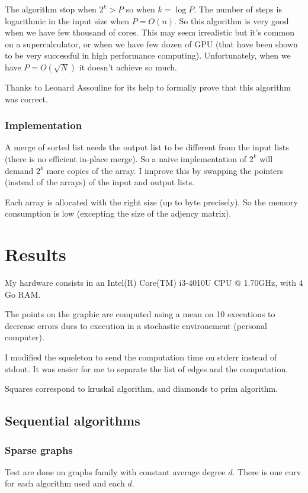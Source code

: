 \documentclass[a4paper, 10pt]{article}
\begin{document}
The algorithm stop when $2^k > P$ so when $k = \log P$. The number of steps is logarithmic in the input size when $P = O(n)$. So this algorithm is very good when we have few thousand of cores. This may seem irrealistic but it's common on a supercalculator, or when we have few dozen of GPU (that have been shown to be very successful in high performance computing). Unfortunately, when we have $P = O(\sqrt{N})$ it doesn't achieve so much.  
  
Thanks to Leonard Assouline for its help to formally prove that this algorithm was correct.  
  
\subsubsection{Implementation}  
  
A merge of sorted list needs the output list to be different from the input lists (there is no efficient in-place merge). So a naive implementation of $2^k$ will demand $2^k$ more copies of the array. I improve this by swapping the pointers (instead of the arrays) of the input and output lists.  
  
Each array is allocated with the right size (up to byte precisely). So the memory consumption is low (excepting the size of the adjency matrix).  
  
\section{Results}
My hardware consists in an Intel(R) Core(TM) i3-4010U CPU @ 1.70GHz, with 4 Go RAM.  
  
The points on the graphic are computed using a mean on 10 executions to decrease errors dues to execution in a stochastic environement (personal computer).  
  
I modified the squeleton to send the computation time on stderr instead of stdout. It was easier for me to separate the list of edges and the computation.
  
Squares correspond to kruskal algorithm, and diamonds to prim algorithm.   
\subsection{Sequential algorithms}   
\subsubsection{Sparse graphs}
Test are done on graphs family with constant average degree $d$. There is one curv for each algorithm used and each $d$.  
  
\end{document}
